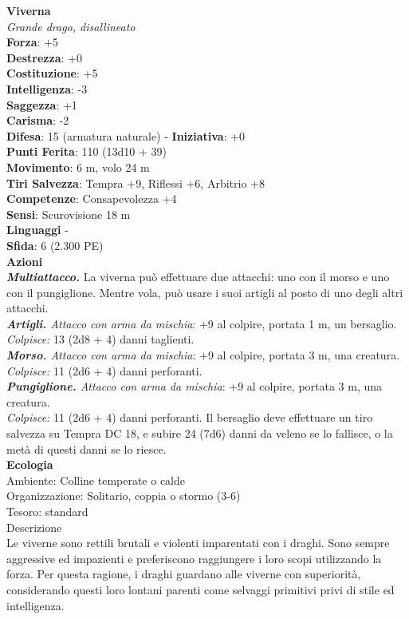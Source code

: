 \begin{multicols}{2}
\medskip\textbf{Viverna}\\
\emph{Grande drago, disallineato}\\
\textbf{Forza}: +5\\
\textbf{Destrezza}: +0\\
\textbf{Costituzione}: +5\\
\textbf{Intelligenza}: -3\\
\textbf{Saggezza}: +1\\
\textbf{Carisma}: -2\\
\textbf{Difesa}: 15 (armatura naturale) - \textbf{Iniziativa}: +0\\
\textbf{Punti Ferita}: 110 (13d10 + 39)\\
\textbf{Movimento}: 6 m, volo 24 m\\
\textbf{Tiri Salvezza}: Tempra +9, Riflessi +6, Arbitrio +8\\
\textbf{Competenze}: Consapevolezza +4\\
\textbf{Sensi}: Scurovisione 18 m\\
\textbf{Linguaggi} -\\
\textbf{Sfida}: 6 (2.300 PE)\smallskip\\
\smallskip\textbf{Azioni}\\
\emph{\textbf{Multiattacco.}} La viverna può effettuare due attacchi: uno con il morso e uno con il pungiglione. Mentre vola, può usare i suoi artigli al posto di uno degli altri attacchi.\\
\emph{\textbf{Artigli.} Attacco con arma da mischia}: +9 al colpire, portata 1 m, un bersaglio.\\
\emph{Colpisce:} 13 (2d8 + 4) danni taglienti.\\
\emph{\textbf{Morso.} Attacco con arma da mischia}: +9 al colpire, portata 3 m, una creatura.\\
\emph{Colpisce:} 11 (2d6 + 4) danni perforanti.\\
\emph{\textbf{Pungiglione.} Attacco con arma da mischia}: +9 al colpire, portata 3 m, una creatura.\\
\emph{Colpisce:} 11 (2d6 + 4) danni perforanti. Il bersaglio deve effettuare un tiro salvezza su Tempra DC  18, e subire 24 (7d6) danni da veleno se lo fallisce, o la metà di questi danni se lo riesce.\\
\textbf{Ecologia}\\
Ambiente: Colline temperate o calde\\
Organizzazione: Solitario, coppia o stormo (3-6)\\
Tesoro: standard\\
Descrizione\\
Le viverne sono rettili brutali e violenti imparentati con i draghi. Sono sempre aggressive ed impazienti e preferiscono raggiungere i loro scopi utilizzando la forza. Per questa ragione, i draghi guardano alle viverne con superiorità, considerando questi loro lontani parenti come selvaggi primitivi privi di stile ed intelligenza.\\


\end{multicols}
